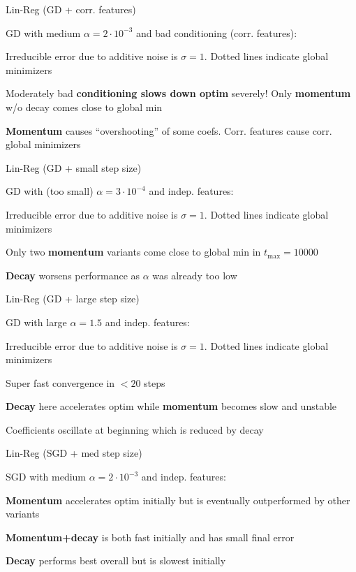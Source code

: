 \documentclass[11pt,compress,t,notes=noshow, xcolor=table]{beamer}
\begin{document}
\begin{framei}[fs=footnotesize]{Lin-Reg (GD + corr. features)}
\item GD with medium $\alpha=2\cdot10^{-3}$ and bad conditioning (corr. features):
\item Irreducible error due to additive noise is $\sigma=1$. Dotted lines indicate global minimizers
\item Moderately bad \textbf{conditioning slows down optim} severely! Only \textbf{momentum} w/o decay comes close to global min
\item \textbf{Momentum} causes ``overshooting'' of some coefs. Corr. features cause corr. global minimizers
\end{framei}


\begin{framei}[fs=small]{Lin-Reg (GD + small step size)}
\item GD with (too small) $\alpha=3\cdot10^{-4}$ and indep. features:
\item Irreducible error due to additive noise is $\sigma=1$. Dotted lines indicate global minimizers
\item Only two \textbf{momentum} variants come close to global min in $t_{\text{max}}=10000$
\item \textbf{Decay} worsens performance as $\alpha$ was already too low
\end{framei}


\begin{framei}[fs=footnotesize]{Lin-Reg (GD + large step size)}
\item GD with large $\alpha=1.5$ and indep. features:
\item Irreducible error due to additive noise is $\sigma=1$. Dotted lines indicate global minimizers
\item Super fast convergence in $<20$ steps
\item \textbf{Decay} here accelerates optim while \textbf{momentum} becomes slow and unstable
\item Coefficients oscillate at beginning which is reduced by decay
\end{framei}


\begin{framei}[fs=small]{Lin-Reg (SGD + med step size)}
\item SGD with medium $\alpha=2\cdot10^{-3}$ and indep. features:
\item \textbf{Momentum} accelerates optim initially but is eventually outperformed by other variants
\item \textbf{Momentum+decay} is both fast initially and has small final error
\item \textbf{Decay} performs best overall but is slowest initially
\end{framei}
\end{document}
